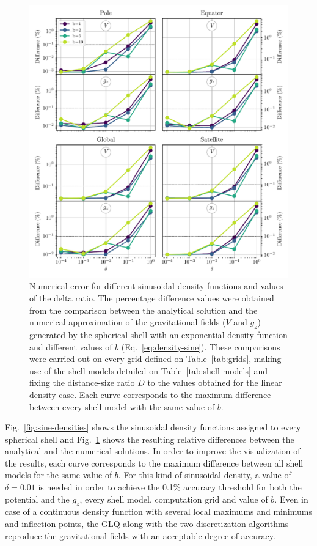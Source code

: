 \documentclass[extra, referee]{gji}
\begin{document}
\begin{figure}
\centering
\includegraphics[width=\linewidth]{figures/sine-density-diffs.pdf}
\caption{
    Numerical error for different sinusoidal density functions and values of the delta
    ratio.
    The percentage difference values were obtained from the comparison between the
    analytical solution and the numerical approximation of the gravitational fields ($V$
    and $g_z$) generated by the spherical shell with an exponential density function and
    different values of $b$ (Eq.~\ref{eq:density-sine}).
    These comparisons were carried out on every grid defined on Table~\ref{tab:grids},
    making use of the shell models detailed on Table~\ref{tab:shell-models} and
    fixing the distance-size ratio $D$ to the values obtained for the linear density
    case.
    Each curve corresponds to the maximum difference between every shell model with the
    same value of $b$.
    }
\label{fig:delta-sine}
\end{figure}

Fig.~\ref{fig:sine-densities} shows the sinusoidal density functions assigned to every
spherical shell and Fig.~\ref{fig:delta-sine} shows the resulting relative differences
between the analytical and the numerical solutions.
In order to improve the visualization of the results, each curve corresponds to the
maximum difference between all shell models for the same value of $b$.
For this kind of sinusoidal density, a value of $\delta=0.01$ is needed in order to
achieve the 0.1\% accuracy threshold for both the potential and the $g_{z}$, every
shell model, computation grid and value of $b$.
Even in case of a continuous density function with several local maximums and minimums
and inflection points, the GLQ along with the two discretization algorithms reproduce
the gravitational fields with an acceptable degree of accuracy.
\end{document}
